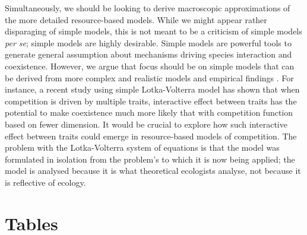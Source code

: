 \documentclass[a4paper,11pt]{article}
\begin{document}
Simultaneously, we should be looking to derive macroscopic
approximations of the more detailed resource-based models.  While we
might appear rather disparaging of simple models, this is not meant
to be a criticism of simple models \textit{per se}; simple models are
highly desirable.  Simple models are powerful tools to generate general assumption about mechanisms driving species interaction and coexistence. However, we argue that focus should be on simple models
that can be derived from more complex and realistic models and
empirical findings \citep[e.g.][]{Champagnat-2006}. For instance, a recent study \citep{Doebeli-2010} using simple Lotka-Volterra model has shown that when competition is driven by multiple traits, interactive effect between traits has the potential to make coexistence much more likely that with competition function based on fewer dimension. It would be crucial to explore how such interactive effect between traits could emerge in resource-based models of competition.
The problem with the Lotka-Volterra system of equations is that the
model was formulated in isolation from the problem's to which it is
now being applied; the model is analysed because it is what
theoretical ecologists analyse, not because it is reflective of
ecology.


\clearpage

\section{Tables}
\end{document}
